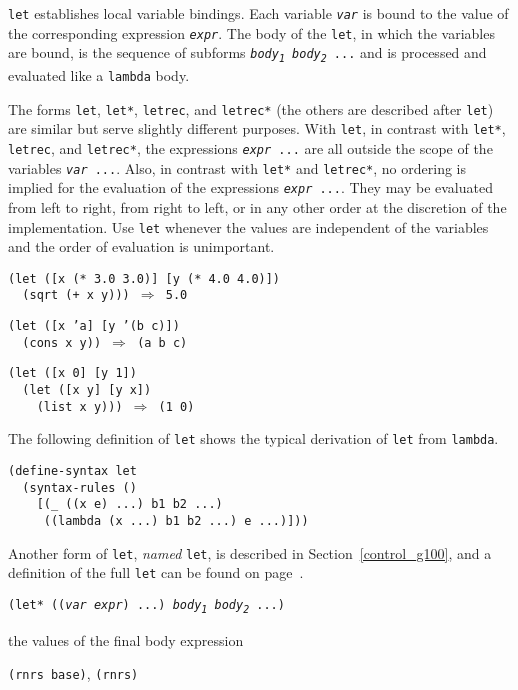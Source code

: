 \texttt{let} establishes \label{binding_s17}local variable bindings.
Each variable \texttt{\textit{var}} is bound to the value of the corresponding
expression \texttt{\textit{expr}}.
The body of the \texttt{let}, in which the variables are bound, is
the sequence of subforms \texttt{\textit{body\textsubscript{1}} \textit{body\textsubscript{2}} ...} and is
processed and evaluated like a \texttt{lambda} body.

The forms \texttt{let}, \texttt{let*}, \texttt{letrec}, and \texttt{letrec*}
(the others are described after \texttt{let}) are similar but serve
slightly different purposes.
With \texttt{let}, in contrast with \texttt{let*}, \texttt{letrec}, and \texttt{letrec*},
the expressions \texttt{\textit{expr} ...} are all outside the scope of
the variables \texttt{\textit{var} ...}.
Also, in contrast with \texttt{let*} and \texttt{letrec*}, no ordering is implied for the
evaluation of the expressions \texttt{\textit{expr} ...}.
They may be evaluated from left to right, from right to left, or
in any other order at the discretion of the implementation.
Use \texttt{let} whenever the values are independent of the variables
and the order of evaluation is unimportant.


\begin{alltt}
(let ([x (* 3.0 3.0)] [y (* 4.0 4.0)])
  (sqrt (+ x y))) \(\Rightarrow\) 5.0

(let ([x 'a] [y '(b c)])
  (cons x y)) \(\Rightarrow\) (a b c)

(let ([x 0] [y 1])
  (let ([x y] [y x])
    (list x y))) \(\Rightarrow\) (1 0)
\end{alltt}


The following definition of \texttt{let} shows the
typical derivation of \texttt{let} from \texttt{lambda}.


\begin{alltt}
(define-syntax let
  (syntax-rules ()
    [(\_{} ((x e) ...) b1 b2 ...)
     ((lambda (x ...) b1 b2 ...) e ...)]))
\end{alltt}


Another form of \texttt{let}, \textit{named} \texttt{let}, is described in
Section \ref{control_g100}, and a definition of the full
\texttt{let} can be found on page \pageref{syntax_defn_let}.


\begin{description}

\label{binding_s18}\item[syntax] \texttt{(let* ((\textit{var} \textit{expr}) ...) \textit{body\textsubscript{1}} \textit{body\textsubscript{2}} ...)}



\item[returns] the values of the final body expression


\item[libraries] \texttt{(rnrs base)}, \texttt{(rnrs)}
\end{description}

